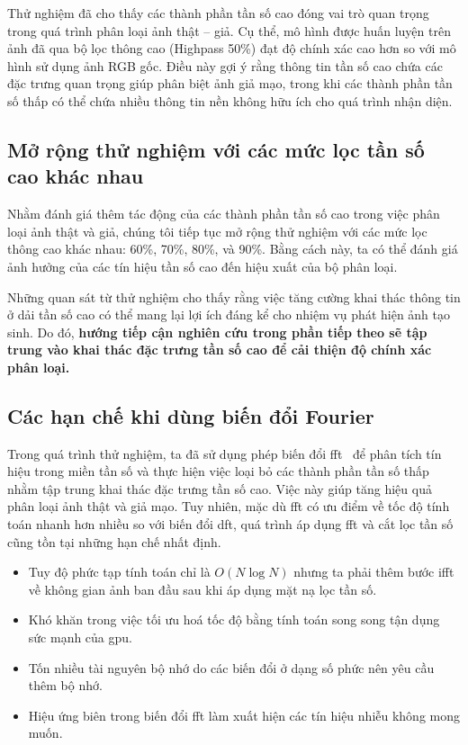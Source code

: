 %
Thử nghiệm đã cho thấy các thành phần tần số cao đóng vai trò quan trọng trong quá trình phân loại ảnh thật – giả. Cụ thể, mô hình được huấn luyện trên ảnh đã qua bộ lọc thông cao (Highpass 50\%) đạt độ chính xác cao hơn so với mô hình sử dụng ảnh RGB gốc. Điều này gợi ý rằng thông tin tần số cao chứa các đặc trưng quan trọng giúp phân biệt ảnh giả mạo, trong khi các thành phần tần số thấp có thể chứa nhiều thông tin nền không hữu ích cho quá trình nhận diện.  

\subsection*{Mở rộng thử nghiệm với các mức lọc tần số cao khác nhau}

Nhằm đánh giá thêm tác động của các thành phần tần số cao trong việc phân loại ảnh thật và giả, chúng tôi tiếp tục mở rộng thử nghiệm với các mức lọc thông cao khác nhau: 60\%, 70\%, 80\%, và 90\%. Bằng cách này, ta có thể đánh giá ảnh hưởng của các tín hiệu tần số cao đến hiệu xuất của bộ phân loại.

Những quan sát từ thử nghiệm cho thấy rằng việc tăng cường khai thác thông tin ở dải tần số cao có thể mang lại lợi ích đáng kể cho nhiệm vụ phát hiện ảnh tạo sinh. Do đó, \textbf{hướng tiếp cận nghiên cứu trong phần tiếp theo sẽ tập trung vào khai thác đặc trưng tần số cao để cải thiện độ chính xác phân loại.}

\subsection{Các hạn chế khi dùng biến đổi Fourier}

Trong quá trình thử nghiệm, ta đã sử dụng phép biến đổi \gls{fft}~\cite{Arunachalam2013TheFF} để phân tích tín hiệu trong miền tần số và thực hiện việc loại bỏ các thành phần tần số thấp nhằm tập trung khai thác đặc trưng tần số cao. Việc này giúp tăng hiệu quả phân loại ảnh thật và giả mạo. Tuy nhiên, mặc dù \gls{fft} có ưu điểm về tốc độ tính toán nhanh hơn nhiều so với biến đổi \gls{dft}, quá trình áp dụng \gls{fft} và cắt lọc tần số cũng tồn tại những hạn chế nhất định.

\begin{itemize}
	\item Tuy độ phức tạp tính toán chỉ là $O(N\log{N})$ nhưng ta phải thêm bước \gls{ifft} về không gian ảnh ban đầu sau khi áp dụng mặt nạ lọc tần số.
	\item Khó khăn trong việc tối ưu hoá tốc độ bằng tính toán song song tận dụng sức mạnh của \gls{gpu}.
	\item Tốn nhiều tài nguyên bộ nhớ do các biến đổi ở dạng số phức nên yêu cầu thêm bộ nhớ.
	\item Hiệu ứng biên trong biến đổi \gls{fft} làm xuất hiện các tín hiệu nhiễu không mong muốn.
\end{itemize}

